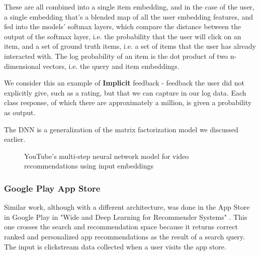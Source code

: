 \documentclass[11pt, table]{diazessay} %
\begin{document}
\begin{sloppypar}
These are all combined into a single item embedding, and in the case of the user, a single embedding that's a blended map of all the user embedding features, and fed into the models' softmax layers, which compare the distance between the output of the softmax layer, i.e. the probability that the user will click on an item, and a set of ground truth items, i.e. a set of items that the user has already interacted with. The log probability of an item is the dot product of two n-dimensional vectors, i.e. the query and item embeddings.

We consider this an example of \textbf{Implicit} feedback - feedback the user did not explicitly give, such as a rating, but that we can capture in our log data.  Each class response, of which there are approximately a million, is given a probability as output.  

The DNN is a generalization of the matrix factorization model we discussed earlier.


\begin{figure}[H]
\caption{YouTube's multi-step neural network model for video recommendations using input embeddings \citep{covington2016deep}}
\end{figure}

\subsubsection*{Google Play App Store}
Similar work, although with a different architecture, was done in the App Store in Google Play in "Wide and Deep Learning for Recommender Systems"  \citep{cheng2016wide}. This one crosses the search and recommendation space because it returns correct ranked and personalized app recommendations as the result of a search query.  The input is clickstream  data collected when a user visits the app store.



\end{sloppypar}
\end{document}
